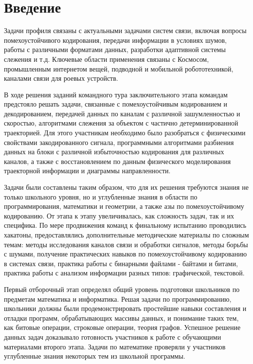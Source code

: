 %
\begingroup
\pagestyle{empty}
\section*{Введение}

Задачи профиля связаны с актуальными задачами систем связи, включая вопросы помехоустойчивого кодирования, передачи информации в условиях шумов, работы с различными форматами данных, разработки адаптивной системы слежения и т.д. Ключевые области применения связаны с Космосом, промышленным интернетом вещей, подводной и мобильной робототехникой, каналами связи для роевых устройств.

В ходе решения заданий командного тура заключительного этапа командам предстояло решать задачи, связанные с помехоустойчивым кодированием и декодированием, передачей данных по каналам с различной зашумленностью и скоростью, алгоритмами слежения за объектом с частично детерминированной траекторией. Для этого участникам необходимо было разобраться с физическими свойствами закодированного сигнала, программными алгоритмами разбиения данных на блоки с различной избыточностью кодирования для различных каналов, а также с восстановлением по данным физического моделирования траекторной информации и диаграммы направленности.  

Задачи были составлены таким образом, что для их решения требуются знания не только школьного уровня, но и углубленные знания в области по программирования, математики и геометрии, а также азы по помехоустойчивому кодированию. От этапа к этапу увеличивалась, как сложность задач, так и их специфика. По мере продвижения команд к финальному испытанию проводились хакатоны, предоставлялись дополнительные методические материалы по сложным темам: методы исследования каналов связи и обработки сигналов, методы борьбы с шумами, получение практических навыков по помехоустойчивому кодированию в системах связи, практика работы с бинарными файлами - байтами и битами, практика работы с анализом информации разных типов: графической, текстовой.

Первый отборочный этап определял общий уровень подготовки школьников по предметам математика и информатика. Решая задачи по программированию, школьники должны были продемонстрировать простейшие навыки составления и отладки программ, обрабатывающих массивы данных, и понимание таких тем, как битовые операции, строковые операции, теория графов. Успешное решение данных задач доказывало готовность участников к работе с обучающими материалами второго этапа. Задачи по математике проверяли у участников углубленные знания некоторых тем из школьной программы.


